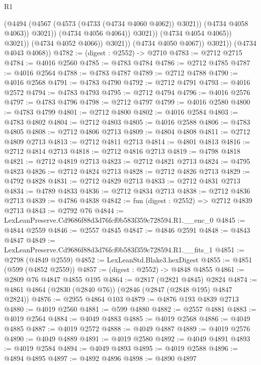 \begin{lexlean}{R1}
\begin{coremodule}
                                  (@4494
                                    (@4567 (@4573 (@4733 (@4734 @4060 @4062)) @3021))
                                    (@4734 @4058 @4063))
                                  @3021))
                              (@4734 @4056 @4064))
                            @3021))
                        (@4734 @4054 @4065))
                      @3021))
                  (@4734 @4052 @4066))
                @3021))
            (@4734 @4050 @4067))
          @3021))
      (@4734 @4043 @4068))
@4782 := (digest : @2552) -> @2710
@4783 := @2712 @2715
@4784 := @4016 @2560
@4785 := @4783 @4784
@4786 := @2712 @4785
@4787 := @4016 @2564
@4788 := @4783 @4787
@4789 := @2712 @4788
@4790 := @4016 @2568
@4791 := @4783 @4790
@4792 := @2712 @4791
@4793 := @4016 @2572
@4794 := @4783 @4793
@4795 := @2712 @4794
@4796 := @4016 @2576
@4797 := @4783 @4796
@4798 := @2712 @4797
@4799 := @4016 @2580
@4800 := @4783 @4799
@4801 := @2712 @4800
@4802 := @4016 @2584
@4803 := @4783 @4802
@4804 := @2712 @4803
@4805 := @4016 @2588
@4806 := @4783 @4805
@4808 := @2712 @4806 @2713
@4809 := @4804 @4808
@4811 := @2712 @4809 @2713
@4813 := @2712 @4811 @2713
@4814 := @4801 @4813
@4816 := @2712 @4814 @2713
@4818 := @2712 @4816 @2713
@4819 := @4798 @4818
@4821 := @2712 @4819 @2713
@4823 := @2712 @4821 @2713
@4824 := @4795 @4823
@4826 := @2712 @4824 @2713
@4828 := @2712 @4826 @2713
@4829 := @4792 @4828
@4831 := @2712 @4829 @2713
@4833 := @2712 @4831 @2713
@4834 := @4789 @4833
@4836 := @2712 @4834 @2713
@4838 := @2712 @4836 @2713
@4839 := @4786 @4838
@4842 := fun (digest : @2552) => @2712 @4839 @2713
@4843 := @2792 @76
@4844 := LexLeanPreserve.Cd9686f88d3d76fcf0b583f359c728594.R1.__enc_0
@4845 := @4844 @2559
@4846 := @2557 @4845
@4847 := @4846 @2591
@4848 := @4843 @4847
@4849 := LexLeanPreserve.Cd9686f88d3d76fcf0b583f359c728594.R1.__fits_1
@4851 := @2798 (@4849 @2559)
@4852 := LexLeanStd.Blake3.hexDigest
@4855 := @4851 (@599 (@4852 @2559))
@4857 := (digest : @2552) -> @4848 @4855
@4861 := @2809 @76 @4847 @4855 @195
@4864 := @2817 (@2821 @4845) @2824
@4874 := @4861 @4864 (@2830 (@2840 @76)) (@2846 (@2847 (@2848 @195) @4847 @2824))
@4876 := @2955 @4864 @103
@4879 := @4876 @193 @4839 @2713
@4880 := @4019 @2560
@4881 := @599 @4880
@4882 := @2557 @4881
@4883 := @4019 @2564
@4884 := @4049 @4883
@4885 := @4019 @2568
@4886 := @4049 @4885
@4887 := @4019 @2572
@4888 := @4049 @4887
@4889 := @4019 @2576
@4890 := @4049 @4889
@4891 := @4019 @2580
@4892 := @4049 @4891
@4893 := @4019 @2584
@4894 := @4049 @4893
@4895 := @4019 @2588
@4896 := @4894 @4895
@4897 := @4892 @4896
@4898 := @4890 @4897

\end{coremodule}
\end{lexlean}
